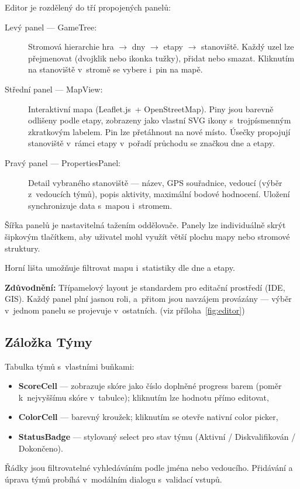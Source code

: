 ﻿\documentclass[a4paper,12pt]{article}
\begin{document}
Editor je rozdělený do tří propojených panelů:

\begin{description}
  \item[Levý panel — GameTree:] Stromová hierarchie hra $\rightarrow$ dny $\rightarrow$ etapy $\rightarrow$
    stanoviště. Každý uzel lze přejmenovat (dvojklik nebo ikonka tužky),
    přidat nebo smazat. Kliknutím na stanoviště v~stromě se vybere i~pin
    na mapě.
  \item[Střední panel — MapView:] Interaktivní mapa (Leaflet.js~+
    OpenStreetMap). Piny jsou barevně odlišeny podle etapy, zobrazeny jako
    vlastní SVG ikony s~trojpísmenným zkratkovým labelem. Pin lze přetáhnout
    na nové místo. Úsečky propojují stanoviště v~rámci etapy v~pořadí průchodu
    se značkou dne a etapy.
  \item[Pravý panel — PropertiesPanel:] Detail vybraného stanoviště — název,
    GPS souřadnice, vedoucí (výběr z~vedoucích týmů), popis aktivity,
    maximální bodové hodnocení. Uložení synchronizuje data s~mapou
    i~stromem.
\end{description}

Šířka panelů je nastavitelná tažením oddělovače. Panely lze individuálně
skrýt šipkovým tlačítkem, aby uživatel mohl využít větší plochu mapy nebo
stromové struktury.

Horní lišta umožňuje filtrovat mapu i~statistiky dle dne a etapy.

\textbf{Zdůvodnění:} Třípamelový layout je standardem pro editační prostředí
(IDE, GIS). Každý panel plní jasnou roli, a~přitom jsou navzájem provázány
— výběr v~jednom panelu se projevuje v~ostatních. (viz příloha~\ref{fig:editor})

\subsection{Záložka Týmy}

Tabulka týmů s~vlastními buňkami:
\begin{itemize}
  \item \textbf{ScoreCell} — zobrazuje skóre jako číslo doplněné progress
    barem (poměr k~nejvyššímu skóre v~tabulce); kliknutím lze hodnotu přímo
    editovat,
  \item \textbf{ColorCell} — barevný kroužek; kliknutím se otevře nativní
    color picker,
  \item \textbf{StatusBadge} — stylovaný select pro stav týmu (Aktivní /
    Diskvalifikován / Dokončeno).
\end{itemize}
Řádky jsou filtrovatelné vyhledáváním podle jména nebo vedoucího. Přidávání
a úprava týmů probíhá v~modálním dialogu s~validací vstupů.
\end{document}
